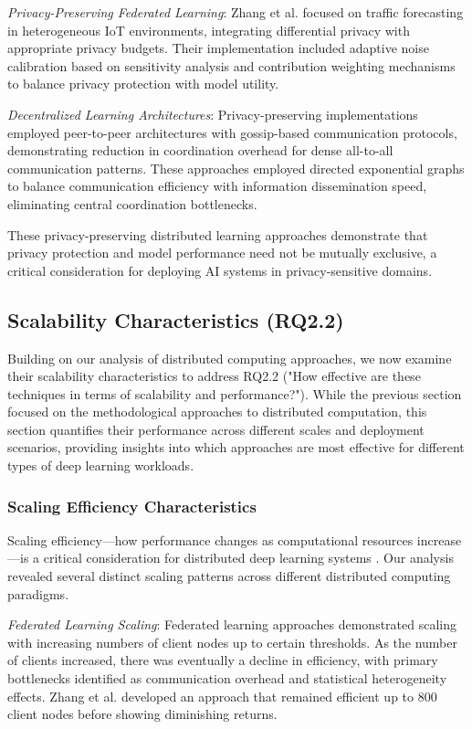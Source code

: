 \textit{Privacy-Preserving Federated Learning}: Zhang et al. \citep{Zhang20229876} focused on traffic forecasting in heterogeneous IoT environments, integrating differential privacy with appropriate privacy budgets. Their implementation included adaptive noise calibration based on sensitivity analysis and contribution weighting mechanisms to balance privacy protection with model utility.

\textit{Decentralized Learning Architectures}: Privacy-preserving implementations employed peer-to-peer architectures with gossip-based communication protocols, demonstrating reduction in coordination overhead for dense all-to-all communication patterns. These approaches employed directed exponential graphs to balance communication efficiency with information dissemination speed, eliminating central coordination bottlenecks.

These privacy-preserving distributed learning approaches demonstrate that privacy protection and model performance need not be mutually exclusive, a critical consideration for deploying AI systems in privacy-sensitive domains.

\subsection{Scalability Characteristics (RQ2.2)}
Building on our analysis of distributed computing approaches, we now examine their scalability characteristics to address RQ2.2 ("How effective are these techniques in terms of scalability and performance?"). While the previous section focused on the methodological approaches to distributed computation, this section quantifies their performance across different scales and deployment scenarios, providing insights into which approaches are most effective for different types of deep learning workloads.

\subsubsection{Scaling Efficiency Characteristics}
Scaling efficiency—how performance changes as computational resources increase—is a critical consideration for distributed deep learning systems \citep{Zhang20229876}. Our analysis revealed several distinct scaling patterns across different distributed computing paradigms.

\textit{Federated Learning Scaling}: Federated learning approaches demonstrated scaling with increasing numbers of client nodes up to certain thresholds. As the number of clients increased, there was eventually a decline in efficiency, with primary bottlenecks identified as communication overhead and statistical heterogeneity effects. Zhang et al. \citep{Zhang20229876} developed an approach that remained efficient up to 800 client nodes before showing diminishing returns.


